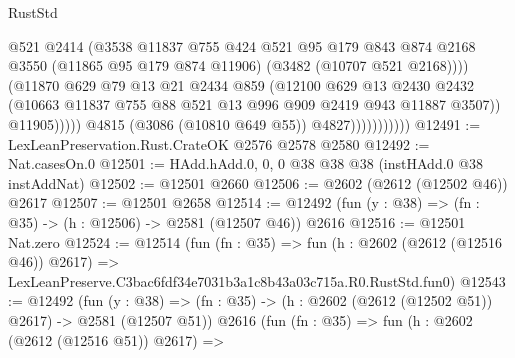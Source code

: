 \begin{lexlean}{RustStd}
\begin{coremodule}
                                    @521
                                    @2414
                                    (@3538
                                      @11837
                                      @755
                                      @424
                                      @521
                                      @95
                                      @179
                                      @843
                                      @874
                                      @2168
                                      @3550
                                      (@11865 @95 @179 @874 @11906)
                                      (@3482 (@10707 @521 @2168))))
                                  (@11870
                                    @629
                                    @79
                                    @13
                                    @21
                                    @2434
                                    @859
                                    (@12100
                                      @629
                                      @13
                                      @2430
                                      @2432
                                      (@10663
                                        @11837
                                        @755
                                        @88
                                        @521
                                        @13
                                        @996
                                        @909
                                        @2419
                                        @943
                                        @11887
                                        @3507))
                                    @11905)))))
                          @4815
                          (@3086 (@10810 @649 @55))
                          @4827)))))))))))
@12491 := LexLeanPreservation.Rust.CrateOK @2576 @2578 @2580
@12492 := Nat.casesOn.{0}
@12501 := HAdd.hAdd.{0, 0, 0} @38 @38 @38 (instHAdd.{0} @38 instAddNat)
@12502 := @12501 @2660
@12506 := @2602 (@2612 (@12502 @46)) @2617
@12507 := @12501 @2658
@12514 := @12492 (fun (y : @38) => (fn : @35) -> (h : @12506) -> @2581 (@12507 @46)) @2616
@12516 := @12501 Nat.zero
@12524 := @12514
    (fun (fn : @35) =>
    fun (h : @2602 (@2612 (@12516 @46)) @2617) =>
    LexLeanPreserve.C3bac6fdf34e7031b3a1c8b43a03c715a.R0.RustStd.fun0)
@12543 := @12492
    (fun (y : @38) => (fn : @35) -> (h : @2602 (@2612 (@12502 @51)) @2617) -> @2581 (@12507 @51))
    @2616
    (fun (fn : @35) =>
    fun (h : @2602 (@2612 (@12516 @51)) @2617) =>

\end{coremodule}
\end{lexlean}
